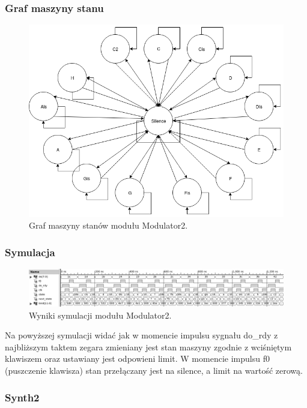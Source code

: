 \documentclass[a4paper,11pt]{article}
\begin{document}
\subsubsection*{Graf maszyny stanu}
\begin{figure}[H]
\center
\includegraphics[scale=0.6]{modulatorMaszyna.png}
\caption{Graf maszyny stanów modułu Modulator2.}
\end{figure}

\subsubsection*{Symulacja}
\begin{figure}[H]
\center
\includegraphics[scale=0.6]{modulatorsymbw.png}
\caption{Wyniki symulacji modułu Modulator2.}
\end{figure}
Na powyższej symulacji widać jak w momencie impulsu sygnału do_rdy z najbliższym taktem zegara zmieniany jest stan maszyny zgodnie z wciśniętym klawiszem oraz ustawiany jest odpowieni limit. W momencie impulsu f0 (puszczenie klawisza) stan przełączany jest na silence, a limit na wartość zerową.

\subsubsection{Synth2}
\end{document}
